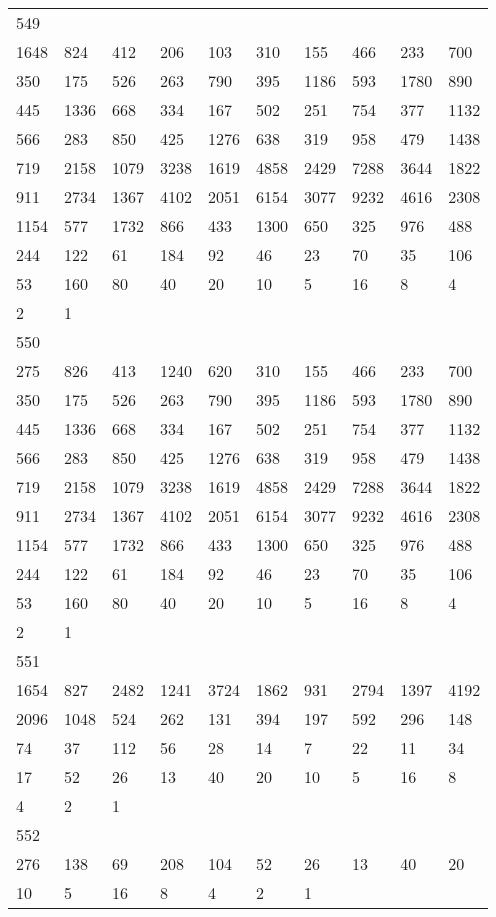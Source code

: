 \begin{longtable}{*{10}{l}}
549&&&&&&&&&\\
1648& 824& 412& 206& 103& 310& 155& 466& 233& 700\\
350& 175& 526& 263& 790& 395& 1186& 593& 1780& 890\\
445& 1336& 668& 334& 167& 502& 251& 754& 377& 1132\\
566& 283& 850& 425& 1276& 638& 319& 958& 479& 1438\\
719& 2158& 1079& 3238& 1619& 4858& 2429& 7288& 3644& 1822\\
911& 2734& 1367& 4102& 2051& 6154& 3077& 9232& 4616& 2308\\
1154& 577& 1732& 866& 433& 1300& 650& 325& 976& 488\\
244& 122& 61& 184& 92& 46& 23& 70& 35& 106\\
53& 160& 80& 40& 20& 10& 5& 16& 8& 4\\
2& 1& \\

550&&&&&&&&&\\
275& 826& 413& 1240& 620& 310& 155& 466& 233& 700\\
350& 175& 526& 263& 790& 395& 1186& 593& 1780& 890\\
445& 1336& 668& 334& 167& 502& 251& 754& 377& 1132\\
566& 283& 850& 425& 1276& 638& 319& 958& 479& 1438\\
719& 2158& 1079& 3238& 1619& 4858& 2429& 7288& 3644& 1822\\
911& 2734& 1367& 4102& 2051& 6154& 3077& 9232& 4616& 2308\\
1154& 577& 1732& 866& 433& 1300& 650& 325& 976& 488\\
244& 122& 61& 184& 92& 46& 23& 70& 35& 106\\
53& 160& 80& 40& 20& 10& 5& 16& 8& 4\\
2& 1& \\

551&&&&&&&&&\\
1654& 827& 2482& 1241& 3724& 1862& 931& 2794& 1397& 4192\\
2096& 1048& 524& 262& 131& 394& 197& 592& 296& 148\\
74& 37& 112& 56& 28& 14& 7& 22& 11& 34\\
17& 52& 26& 13& 40& 20& 10& 5& 16& 8\\
4& 2& 1& \\

552&&&&&&&&&\\
276& 138& 69& 208& 104& 52& 26& 13& 40& 20\\
10& 5& 16& 8& 4& 2& 1& \\


\end{longtable}
